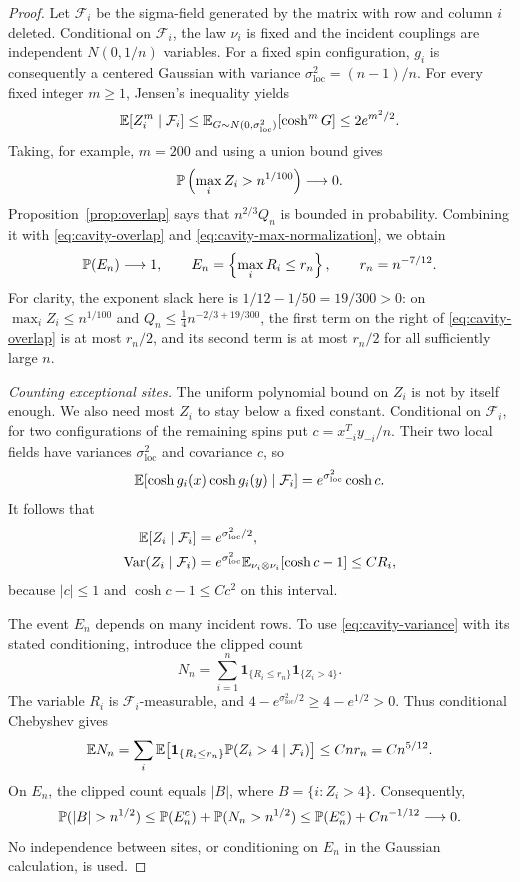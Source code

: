 \begin{proof}
Let $\mathcal F_i$ be the sigma-field generated by the matrix with row
and column $i$ deleted.  Conditional on $\mathcal F_i$, the law $\nu_i$
is fixed and the incident couplings are independent $N(0,1/n)$
variables.  For a fixed spin configuration, $g_i$ is consequently a
centered Gaussian with variance $\sigma_{\mathrm{loc}}^2=(n-1)/n$.  For every fixed
integer $m\ge1$, Jensen's inequality yields
\[
 \mathbb E[Z_i^m\mid\mathcal F_i]
 \le \mathbb E_{G\sim N(0,\sigma_{\mathrm{loc}}^2)}[\cosh^mG]
 \le2e^{m^2/2}.
\]
Taking, for example, $m=200$ and using a union bound gives
\begin{equation}\label{eq:cavity-max-normalization}
 \mathbb P\left(\max_iZ_i>n^{1/100}\right)\longrightarrow0.
\end{equation}
Proposition~\ref{prop:overlap} says that $n^{2/3}Q_n$ is bounded in
probability.  Combining it with \eqref{eq:cavity-overlap} and
\eqref{eq:cavity-max-normalization}, we obtain
\begin{equation}\label{eq:cavity-small-overlaps}
 \mathbb P(E_n)\longrightarrow1,
 \qquad E_n=\left\{\max_iR_i\le r_n\right\},
 \qquad r_n=n^{-7/12}.
\end{equation}
For clarity, the exponent slack here is
$1/12-1/50=19/300>0$: on
$\max_iZ_i\le n^{1/100}$ and
$Q_n\le\tfrac14 n^{-2/3+19/300}$, the first term on the right of
\eqref{eq:cavity-overlap} is at most $r_n/2$, and its second term is
at most $r_n/2$ for all sufficiently large $n$.

\smallskip\noindent\emph{Counting exceptional sites.}
The uniform polynomial bound on $Z_i$ is not by itself enough. We also
need most $Z_i$ to stay below a fixed constant. Conditional on
$\mathcal F_i$, for two configurations of
the remaining spins put $c=x_{-i}^Ty_{-i}/n$.  Their two local fields
have variances $\sigma_{\mathrm{loc}}^2$ and covariance $c$, so
\[
 \mathbb E[\cosh g_i(x)\cosh g_i(y)\mid\mathcal F_i]
 =e^{\sigma_{\mathrm{loc}}^2}\cosh c.
\]
It follows that
\begin{align}
 \mathbb E[Z_i\mid\mathcal F_i]&=e^{\sigma_{\mathrm{loc}}^2/2},\label{eq:cavity-mean}\\
 \operatorname{Var}(Z_i\mid\mathcal F_i)
 &=e^{\sigma_{\mathrm{loc}}^2}\mathbb E_{\nu_i\otimes\nu_i}[\cosh c-1]
 \le C R_i,\label{eq:cavity-variance}
\end{align}
because $|c|\le1$ and $\cosh c-1\le Cc^2$ on this interval.

The event $E_n$ depends on many incident rows.  To use
\eqref{eq:cavity-variance} with its stated conditioning, introduce the
clipped count
\[
 N_n=\sum_{i=1}^n
       \mathbf1_{\{R_i\le r_n\}}\mathbf1_{\{Z_i>4\}}.
\]
The variable $R_i$ is $\mathcal F_i$-measurable, and
$4-e^{\sigma_{\mathrm{loc}}^2/2}\ge4-e^{1/2}>0$.  Thus conditional Chebyshev gives
\[
 \mathbb E N_n
 =\sum_i\mathbb E\!\left[
    \mathbf1_{\{R_i\le r_n\}}
    \mathbb P(Z_i>4\mid\mathcal F_i)\right]
 \le Cnr_n=Cn^{5/12}.
\]
On $E_n$, the clipped count equals $|B|$, where
$B=\{i:Z_i>4\}$.  Consequently,
\begin{equation}\label{eq:cavity-exceptional-count}
 \Prob(|B|>n^{1/2})
 \le\Prob(E_n^c)+\Prob(N_n>n^{1/2})
 \le\Prob(E_n^c)+Cn^{-1/12}\longrightarrow0.
\end{equation}
No independence between sites, or conditioning on $E_n$ in the Gaussian
calculation, is used.


\end{proof}
